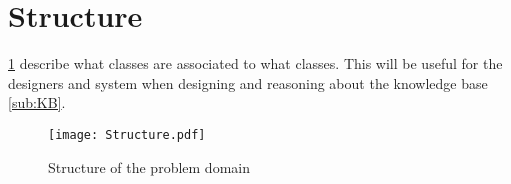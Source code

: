 \section{Structure}\label{sub:structure}

\cref{fig:structure} describe what classes are associated to what classes. This will be useful for the designers and system when designing and reasoning about the knowledge base \cref{sub:KB}.

\begin{figure}
  \label{fig:structure}
  \centering
  \begin{adjustbox}{max width=\textwidth}
    \texttt{[image: Structure.pdf]}
  \end{adjustbox}
  \caption{Structure of the problem domain}
\end{figure}
